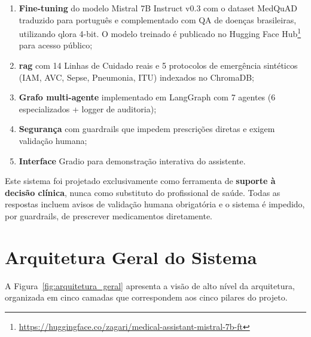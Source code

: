 \begin{enumerate}
    \item \textbf{Fine-tuning} do modelo Mistral 7B Instruct v0.3 com o dataset MedQuAD traduzido para português e complementado com QA de doenças brasileiras, utilizando \acrfull{qlora} 4-bit. O modelo treinado é publicado no Hugging Face Hub\footnote{\url{https://huggingface.co/zagari/medical-assistant-mistral-7b-ft}} para acesso público;
    \item \textbf{\acrfull{rag}} com 14 Linhas de Cuidado reais e 5 protocolos de emergência sintéticos (IAM, AVC, Sepse, Pneumonia, ITU) indexados no ChromaDB;
    \item \textbf{Grafo multi-agente} implementado em LangGraph com 7 agentes (6 especializados + logger de auditoria);
    \item \textbf{Segurança} com guardrails que impedem prescrições diretas e exigem validação humana;
    \item \textbf{Interface} Gradio para demonstração interativa do assistente.
\end{enumerate}

\begin{importantbox}
Este sistema foi projetado exclusivamente como ferramenta de \textbf{suporte à decisão clínica}, nunca como substituto do profissional de saúde. Todas as respostas incluem avisos de validação humana obrigatória e o sistema é impedido, por guardrails, de prescrever medicamentos diretamente.
\end{importantbox}

\section{Arquitetura Geral do Sistema}

A Figura~\ref{fig:arquitetura_geral} apresenta a visão de alto nível da arquitetura, organizada em cinco camadas que correspondem aos cinco pilares do projeto.

